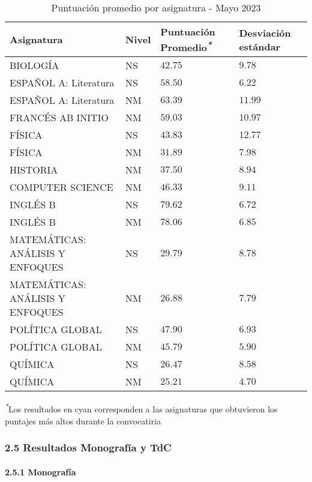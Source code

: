 \documentclass[
  letterpaper,
  DIV=11,
  numbers=noendperiod]{scrartcl}
\let\oldparagraph\paragraph
\renewcommand{\paragraph}[1]{\oldparagraph{#1}\mbox{}}
\begin{document}
\hypertarget{tbl-puntos-promedio}{}
\setlength{\LTpost}{0mm}
\begin{longtable}{llll}
\caption{\label{tbl-puntos-promedio}Puntuación promedio por asignatura - Mayo 2023 }\tabularnewline

\toprule
Asignatura & Nivel & Puntuación Promedio\textsuperscript{\textit{*}} & Desviación estándar \\ 
\midrule
BIOLOGÍA & NS & $42.75$ & $9.78$ \\ 
ESPAÑOL A: Literatura & NS & $58.50$ & $6.22$ \\ 
ESPAÑOL A: Literatura & NM & $63.39$ & $11.99$ \\ 
FRANCÉS AB INITIO & NM & $59.03$ & $10.97$ \\ 
FÍSICA & NS & $43.83$ & $12.77$ \\ 
FÍSICA & NM & $31.89$ & $7.98$ \\ 
HISTORIA & NM & $37.50$ & $8.94$ \\ 
COMPUTER SCIENCE & NM & $46.33$ & $9.11$ \\ 
INGLÉS B & NS & $79.62$ & $6.72$ \\ 
INGLÉS B & NM & $78.06$ & $6.85$ \\ 
MATEMÁTICAS: ANÁLISIS Y ENFOQUES & NS & $29.79$ & $8.78$ \\ 
MATEMÁTICAS: ANÁLISIS Y ENFOQUES & NM & $26.88$ & $7.79$ \\ 
POLÍTICA GLOBAL & NS & $47.90$ & $6.93$ \\ 
POLÍTICA GLOBAL & NM & $45.79$ & $5.90$ \\ 
QUÍMICA & NS & $26.47$ & $8.58$ \\ 
QUÍMICA & NM & $25.21$ & $4.70$ \\ 
\bottomrule
\end{longtable}
\begin{minipage}{\linewidth}
\textsuperscript{\textit{*}}Los resultados en cyan corresponden a las asignaturas que obtuvieron los puntajes más altos durante la convocatiria\\
\end{minipage}

\hypertarget{resultados-monografuxeda-y-tdc}{%
\subsubsection{2.5 Resultados Monografía y
TdC}\label{resultados-monografuxeda-y-tdc}}

\hypertarget{monografuxeda}{%
\paragraph{2.5.1 Monografía}\label{monografuxeda}}
\end{document}
